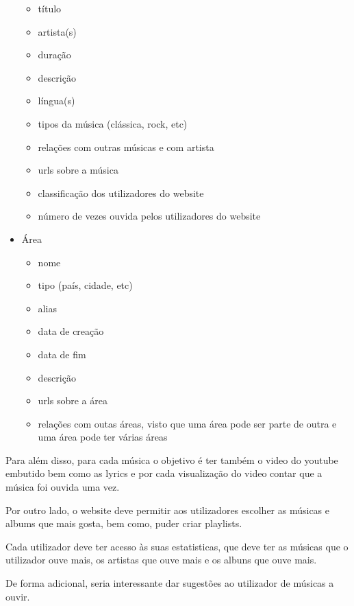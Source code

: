 \documentclass{article}
\begin{document}
\begin{itemize}
\begin{itemize}
            \item título
            \item artista(s)
            \item duração
            \item descrição
            \item língua(s)
            \item tipos da música (clássica, rock, etc)
            \item relações com outras músicas e com artista
            \item urls sobre a música
            \item classificação dos utilizadores do website
            \item número de vezes ouvida pelos utilizadores do website
        \end{itemize}
    \item Área
        \begin{itemize}
            \item nome
            \item tipo (país, cidade, etc)
            \item alias
            \item data de creação
            \item data de fim
            \item descrição
            \item urls sobre a área
            \item relações com outas áreas, visto que uma área pode ser parte de outra e uma área pode ter várias áreas
        \end{itemize}
\end{itemize}

Para além disso, para cada música o objetivo é ter também o video do youtube embutido bem como as lyrics e por cada visualização do video contar que a música foi ouvida uma vez.

Por outro lado, o website deve permitir aos utilizadores escolher as músicas e albums que mais gosta, bem como, puder criar playlists.

Cada utilizador deve ter acesso às suas estatisticas, que deve ter as músicas que o utilizador ouve mais, os artistas que ouve mais e os albuns que ouve mais.

De forma adicional, seria interessante dar sugestões ao utilizador de músicas a ouvir.
\end{document}
